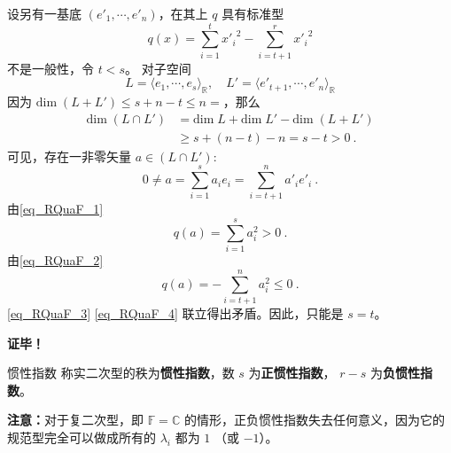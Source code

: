 设另有一基底 $( e'_1,\cdots, e'_n)$，在其上 $q$ 具有标准型
\begin{equation}\label{eq_RQuaF_2}
q( x)=\sum_{i=1}^{t}{x'_i}^2-\sum_{i=t+1}^{r} {x'_{i}}^{2}
\end{equation}
不是一般性，令 $t<s$。
对子空间
\begin{equation}
L=\langle  e_1,\cdots, e_s\rangle_\mathbb{R},\quad L'=\langle  e'_{t+1},\cdots, e'_n\rangle_\mathbb{R}
\end{equation}
因为 $\mathrm{dim}\;(L+L')\leq s+n-t\leq n=$，那么
\begin{equation}
\begin{aligned}
\mathrm{dim}\;(L\cap L')&=\mathrm{dim}\; L+\mathrm{dim}\; L'-\mathrm{dim}\;(L+L')\\
&\geq s+(n-t)-n=s-t> 0~.
\end{aligned}
\end{equation}
可见，存在一非零矢量 $ a\in(L\cap L')$:
\begin{equation}
 0\neq a=\sum_{i=1}^s a_i e_i=\sum_{i=t+1}^n a'_i  e'_i~.
\end{equation}
由\autoref{eq_RQuaF_1} 
\begin{equation}\label{eq_RQuaF_3}
q( a)=\sum_{i=1}^s a_i^2>0~.
\end{equation}
由\autoref{eq_RQuaF_2} 
\begin{equation}\label{eq_RQuaF_4}
q( a)=-\sum_{i=t+1}^n a_i^2\leq 0~.
\end{equation}
\autoref{eq_RQuaF_3} \autoref{eq_RQuaF_4} 联立得出矛盾。因此，只能是 $s=t$。

\textbf{证毕！}
\begin{definition}{惯性指数}\label{def_RQuaF_1}
称实二次型的秩为\textbf{惯性指数}，数 $s$ 为\textbf{正惯性指数}， $r-s$ 为\textbf{负惯性指数}。
\end{definition}

\textbf{注意：}对于复二次型，即 $\mathbb F=\mathbb C$ 的情形，正负惯性指数失去任何意义，因为它的规范型完全可以做成所有的 $\lambda_i$ 都为 $1$ （或 $-1$）。